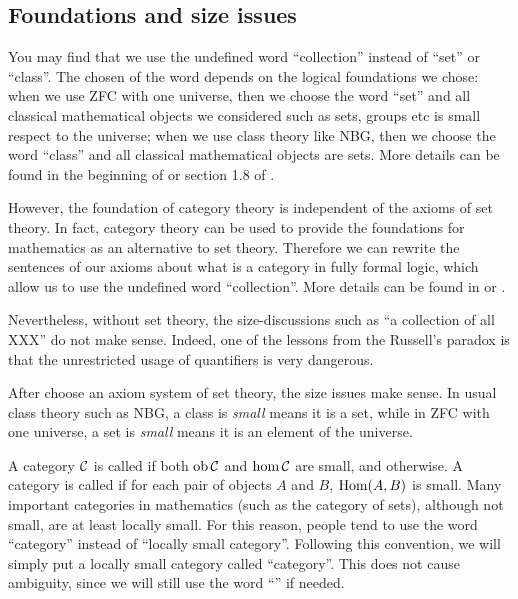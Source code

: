 \subsection{Foundations and size issues}
    You may find that we use the undefined word ``collection'' instead of ``set'' or ``class''. The chosen of the word depends on the logical foundations we chose: when we use ZFC with one universe, then we choose the word ``set'' and all classical mathematical objects we considered such as sets, groups etc is small respect to the universe; when we use class theory like NBG, then we choose the word ``class'' and all classical mathematical objects are sets. More details can be found in the beginning of \cite{borceux} or section 1.8 of \cite{awodey2010category}.

    However, the foundation of category theory is independent of the axioms of set theory. In fact, category theory can be used to provide the foundations for mathematics as an alternative to set theory. Therefore we can rewrite the sentences of our axioms about what is a category in fully formal logic, which allow us to use the undefined word ``collection''. More details can be found in \nlab or \cite{lane1998categories}.

    Nevertheless, without set theory, the size-discussions such as ``a collection of all XXX'' do not make sense. Indeed, one of the lessons from the Russell's paradox is that the unrestricted usage of quantifiers is very dangerous.

    After choose an axiom system of set theory, the size issues make sense. In usual class theory such as NBG, a class is \emph{small} means it is a set, while in ZFC with one universe, a set is \emph{small} means it is an element of the universe.

    A category ${\cal C}$ is called  if both $\operatorname{ob}{\cal C}$ and $\hom{\cal C}$ are small,
    and  otherwise.
    A category is called  if for each pair of objects $A$ and $B$, $\operatorname{Hom}(A, B)$ is small. Many important categories in mathematics (such as the category of sets), although not small, are at least locally small.
    For this reason, people tend to use the word ``category'' instead of ``locally small category''.
    Following this convention, we will simply put a locally small category called ``category''.
    This does not cause ambiguity, since we will still use the word ``'' if needed.

